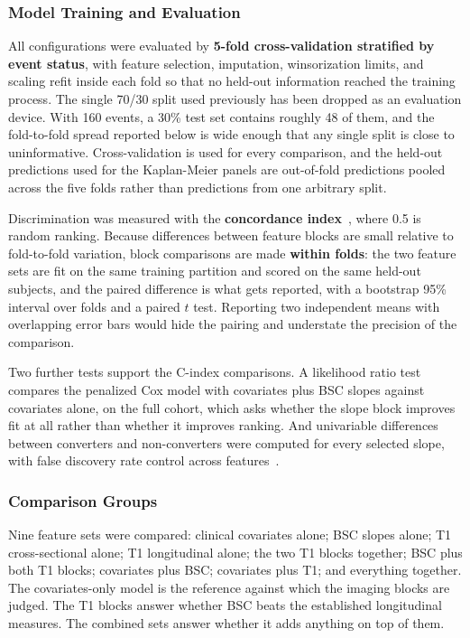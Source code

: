 \documentclass[blue]{ludusofficial}  %
\begin{document}
\subsubsection{Model Training and Evaluation}

All configurations were evaluated by \textbf{5-fold cross-validation stratified by event status}, with feature selection, imputation, winsorization limits, and scaling refit inside each fold so that no held-out information reached the training process. The single 70/30 split used previously has been dropped as an evaluation device. With 160 events, a 30\% test set contains roughly 48 of them, and the fold-to-fold spread reported below is wide enough that any single split is close to uninformative. Cross-validation is used for every comparison, and the held-out predictions used for the Kaplan-Meier panels are out-of-fold predictions pooled across the five folds rather than predictions from one arbitrary split.

Discrimination was measured with the \textbf{concordance index}~\cite{uno2011cstat}, where 0.5 is random ranking. Because differences between feature blocks are small relative to fold-to-fold variation, block comparisons are made \textbf{within folds}: the two feature sets are fit on the same training partition and scored on the same held-out subjects, and the paired difference is what gets reported, with a bootstrap 95\% interval over folds and a paired $t$ test. Reporting two independent means with overlapping error bars would hide the pairing and understate the precision of the comparison.

Two further tests support the C-index comparisons. A likelihood ratio test compares the penalized Cox model with covariates plus BSC slopes against covariates alone, on the full cohort, which asks whether the slope block improves fit at all rather than whether it improves ranking. And univariable differences between converters and non-converters were computed for every selected slope, with false discovery rate control across features~\cite{benjamini1995controlling}.

\subsubsection{Comparison Groups}

Nine feature sets were compared: clinical covariates alone; BSC slopes alone; T1 cross-sectional alone; T1 longitudinal alone; the two T1 blocks together; BSC plus both T1 blocks; covariates plus BSC; covariates plus T1; and everything together. The covariates-only model is the reference against which the imaging blocks are judged. The T1 blocks answer whether BSC beats the established longitudinal measures. The combined sets answer whether it adds anything on top of them.
\end{document}
